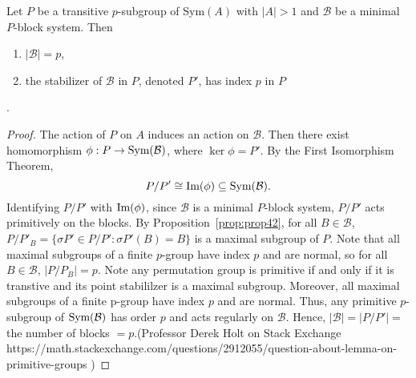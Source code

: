\begin{lemma}Let $P$ be a transitive $p$-subgroup of Sym$(A)$ with $|A|>1$ and $\mathcal{B}$ be a minimal $P$-block system. Then \begin{enumerate}
    \item $|\mathcal{B}|=p$,
    \item the stabilizer of $\mathcal{B}$ in $P$, denoted $P'$, has index $p$ in $P$
\end{enumerate}\cite{luks1982}. 
\end{lemma}
\begin{proof}
    The action of $P$ on $A$ induces an action on $\mathcal{B}$. Then there exist homomorphism $\phi:P\rightarrow\text{Sym}(\mathcal{B})$, where $\ker\phi=P'$. By the First Isomorphism Theorem, \[P/P'\cong\text{Im}(\phi)\subseteq\text{Sym}(\mathcal{B}).\]
    Identifying $P/P'$ with $\text{Im}(\phi)$, since $\mathcal{B}$ is a minimal $P$-block system, $P/P'$ acts primitively on the blocks. By Proposition~\ref{prop:prop42}, for all $B\in\mathcal{B}$, $P/P'_B=\{\sigma P'\in P/P':\sigma P'(B)=B\}$ is a maximal subgroup of $P$. Note that all maximal subgroups of a finite $p$-group have index $p$ and are normal, so for all $B\in\mathcal{B}$, $|P/P_B|=p$.
    Note any permutation group is primitive if and only if it is transtive and its point stabililzer is a maximal subgroup. Moreover, all maximal subgroups of a finite p-group have index $p$ and are normal.  Thus, any primitive $p$-subgroup of $\text{Sym}(\mathcal{B})$ has order $p$ and acts regularly on $\mathcal{B}$. Hence, $|\mathcal{B}|=|P/P'|=$ the number of blocks $=p$.(Professor Derek Holt on Stack Exchange https://math.stackexchange.com/questions/2912055/question-about-lemma-on-primitive-groups )
\end{proof}

